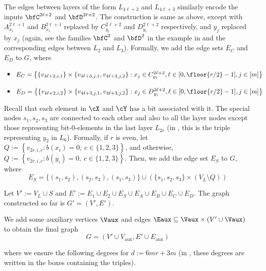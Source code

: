  The edges between layers of the form $L_{4\ell+2}$ and $L_{4\ell+3}$ similarly encode the inputs $\bfC^{2\ell+2}$ and $\bfD^{2\ell+2}$. The construction is same as above, except with $A_{x_i}^{2\ell+1}$ and $B_{x_i}^{2\ell+1}$ replaced by $C_{y_i}^{2\ell+2}$ and $D_{y_i}^{2\ell+2}$ respectively, and $y_j$ replaced by $x_j$ (again, see the families $\bfC^2$ and $\bfD^2$ in the example in  and the corresponding edges between $L_2$ and $L_3$). Formally, we add the edge sets $E_C$ and $E_D$ to $G$, where

\begin{itemize}
\item $E_C= \left\{\left\{v_{4\ell+2, i, 1}\right\}\times \left\{v_{4\ell+3,j,1}, v_{4\ell+3, j, 2}\right\}: x_j\in C_{y_i}^{2\ell+2}, \ell\in [0,\floor{r/2}-1], j\in [m]\right\}$

\item $E_D= \left\{\left\{v_{4\ell+2, i, 2}\right\}\times \left\{v_{4\ell+3,j,1}, v_{4\ell+3, j, 2}\right\}: x_j\in D_{y_i}^{2\ell+2}, \ell\in [0,\floor{r/2}-1], j\in [m]\right\}$
\end{itemize}

 Recall that each element in $\cX$ and $\cY$ has a bit associated with it. The special nodes $s_1,s_2,s_3$ are connected to each other and also to all the layer nodes except those representing bit-$0$-elements in the last layer $L_{2r}$ (in  , this is the triple representing $y_2$ in $L_6$). Formally, if $r$ is even, let $Q := \left\{v_{2r, i, c}: b(x_i) = 0,~c\in \{1,2,3\}\right\}$, and otherwise, $Q := \left\{v_{2r, i, c}: b(y_i) = 0,~c\in \{1,2,3\}\right\}$. Then, we add the edge set $E_S$ to $G$, where 
$$E_S=\{(s_1,s_2), (s_2,s_3), (s_1,s_3)\}\cup \left(\{s_1, s_2, s_3\}\times (V_L \setminus Q)\right)$$

Let $V' := V_L \cup S$ and $E' := E_1\cup E_2 \cup E_S\cup E_A\cup E_B \cup E_C\cup E_D$. The graph constructed so far is $G'=(V',E')$.

 We add some auxiliary vertices $\Vaux$ and edges $\Eaux \subseteq \Vaux\times(V'\cup \Vaux)$ to obtain the final graph 
$$G=\left(V' \cup V_{\text{aux}}, E' \cup E_{\text{aux}} \right)$$

\noindent
where we ensure the following degrees for $d:=6mr+3m$ (in , these degrees are written in the boxes containing the triples). 

